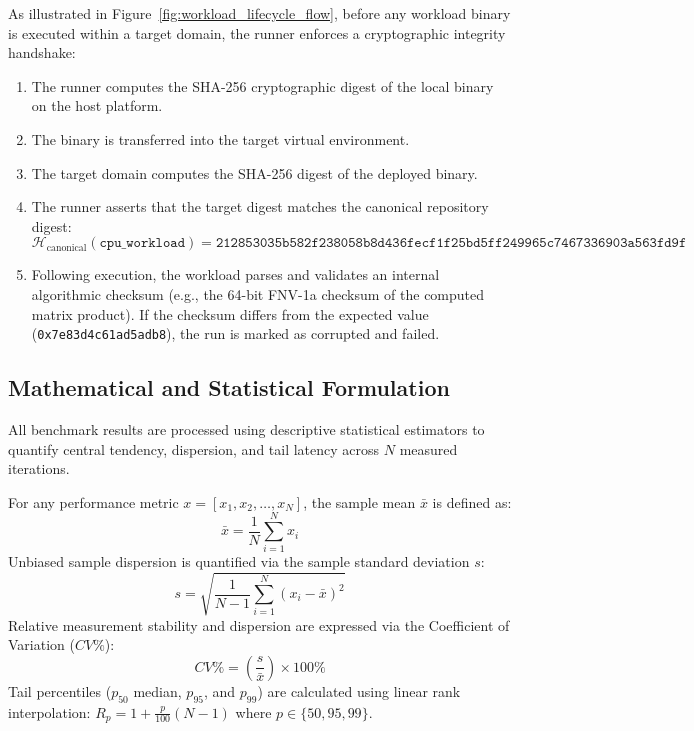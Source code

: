 As illustrated in Figure~\ref{fig:workload_lifecycle_flow}, before any workload binary is executed within a target domain, the runner enforces a cryptographic integrity handshake:
\begin{enumerate}
    \item The runner computes the SHA-256 cryptographic digest of the local binary on the host platform.
    \item The binary is transferred into the target virtual environment.
    \item The target domain computes the SHA-256 digest of the deployed binary.
    \item The runner asserts that the target digest matches the canonical repository digest:
    \begin{equation}
        \mathcal{H}_{\text{canonical}}(\texttt{cpu\_workload}) = \texttt{212853035b582f238058b8d436fecf1f25bd5ff249965c7467336903a563fd9f}
    \end{equation}
    \item Following execution, the workload parses and validates an internal algorithmic checksum (e.g., the 64-bit FNV-1a checksum of the computed matrix product). If the checksum differs from the expected value (\texttt{0x7e83d4c61ad5adb8}), the run is marked as corrupted and failed.
\end{enumerate}

\subsection{Mathematical and Statistical Formulation}
\label{subsec:statistical_formulation}

All benchmark results are processed using descriptive statistical estimators to quantify central tendency, dispersion, and tail latency across $N$ measured iterations.

For any performance metric $x = [x_1, x_2, \dots, x_N]$, the sample mean $\bar{x}$ is defined as:
\begin{equation}
    \bar{x} = \frac{1}{N}\sum_{i=1}^N x_i
\end{equation}
Unbiased sample dispersion is quantified via the sample standard deviation $s$:
\begin{equation}
    s = \sqrt{\frac{1}{N-1}\sum_{i=1}^N (x_i - \bar{x})^2}
\end{equation}
Relative measurement stability and dispersion are expressed via the Coefficient of Variation ($CV\%$):
\begin{equation}
    CV\% = \left(\frac{s}{\bar{x}}\right) \times 100\%
\end{equation}
Tail percentiles ($p_{50}$ median, $p_{95}$, and $p_{99}$) are calculated using linear rank interpolation: $R_p = 1 + \frac{p}{100}(N - 1)$ where $p \in \{50, 95, 99\}$.

